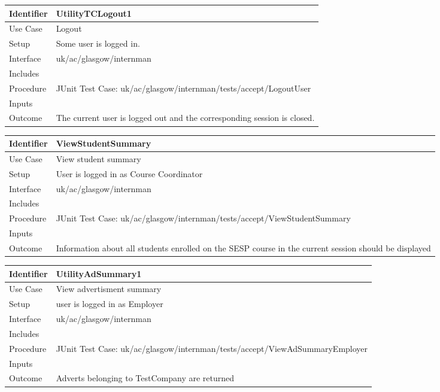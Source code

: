 \vspace{2em}

\begin{tabularx}{\textwidth}{|T|L|}
\hline
Identifier & UtilityTCLogout1\\
\hline
Use Case & Logout\\
\hline
Setup & Some user is logged in.\\
\hline
Interface & uk/ac/glasgow/internman\\
\hline
Includes &\\
\hline
Procedure & JUnit Test Case: uk/ac/glasgow/internman/tests/accept/LogoutUser\\
\hline
Inputs &\\
\hline
Outcome & The current user is logged out and the corresponding session is
closed.\\
\hline
\end{tabularx}

\vspace{2em}
\begin{tabularx}{\textwidth}{|T|L|}
\hline
Identifier & ViewStudentSummary\\
\hline
Use Case & View student summary\\
\hline
Setup & User is logged in as Course Coordinator\\
\hline
Interface & uk/ac/glasgow/internman\\
\hline
Includes &\\
\hline
Procedure & JUnit Test Case: uk/ac/glasgow/internman/tests/accept/ViewStudentSummary\\
\hline
Inputs &\\
\hline
Outcome & Information about all students enrolled on the SESP course in the current session should be displayed\\
\hline
\end{tabularx}

\vspace{2em}

\begin{tabularx}{\textwidth}{|T|L|}
\hline
Identifier & UtilityAdSummary1\\
\hline
Use Case & View advertisment summary\\
\hline
Setup & user is logged in as Employer\\
\hline
Interface & uk/ac/glasgow/internman\\
\hline
Includes &\\
\hline
Procedure & JUnit Test Case: uk/ac/glasgow/internman/tests/accept/ViewAdSummaryEmployer\\
\hline
Inputs &\\
\hline
Outcome & Adverts belonging to TestCompany are returned\\
\hline
\end{tabularx}


